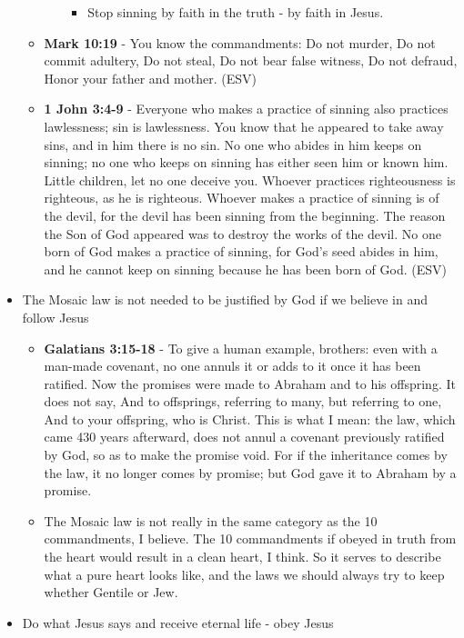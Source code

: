 \documentclass[11pt]{article}
\begin{document}
\begin{itemize}
\begin{itemize}
\begin{itemize}
\begin{itemize}
\item Stop sinning by faith in the truth - by faith in Jesus.
\end{itemize}
\end{itemize}
\item \textbf{Mark 10:19} - You know the commandments: Do not murder, Do not commit adultery, Do not steal, Do not bear false witness, Do not defraud, Honor your father and mother. (ESV)
\item \textbf{1 John 3:4-9} - Everyone who makes a practice of sinning also practices lawlessness; sin is lawlessness.  You know that he appeared to take away sins, and in him there is no sin.  No one who abides in him keeps on sinning; no one who keeps on sinning has either seen him or known him.  Little children, let no one deceive you.  Whoever practices righteousness is righteous, as he is righteous.  Whoever makes a practice of sinning is of the devil, for the devil has been sinning from the beginning.  The reason the Son of God appeared was to destroy the works of the devil.  No one born of God makes a practice of sinning, for God's seed abides in him, and he cannot keep on sinning because he has been born of God.  (ESV)
\end{itemize}
\item The Mosaic law is not needed to be justified by God if we believe in and follow Jesus
\begin{itemize}
\item \textbf{Galatians 3:15-18} - To give a human example, brothers: even with a man-made covenant, no one annuls it or adds to it once it has been ratified. Now the promises were made to Abraham and to his offspring. It does not say, And to offsprings, referring to many, but referring to one, And to your offspring, who is Christ. This is what I mean: the law, which came 430 years afterward, does not annul a covenant previously ratified by God, so as to make the promise void. For if the inheritance comes by the law, it no longer comes by promise; but God gave it to Abraham by a promise.
\item The Mosaic law is not really in the same category as the 10 commandments, I believe. The 10 commandments if obeyed in truth from the heart would result in a clean heart, I think. So it serves to describe what a pure heart looks like, and the laws we should always try to keep whether Gentile or Jew.
\end{itemize}
\item Do what Jesus says and receive eternal life - obey Jesus
\begin{itemize}

\end{itemize}
\end{itemize}
\end{document}
